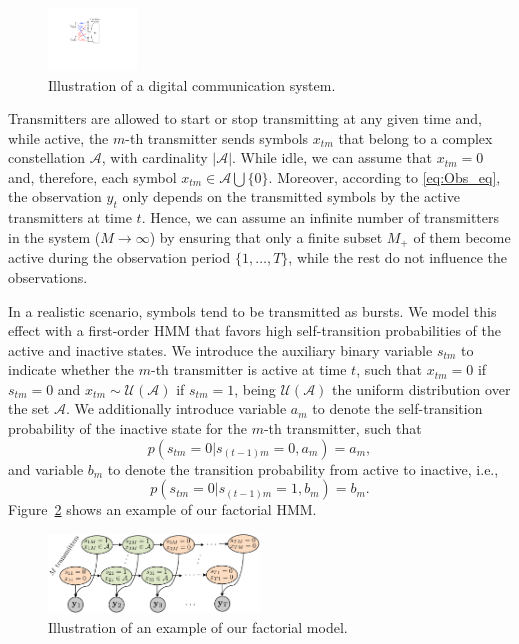 \documentclass[a4paper]{article}
\def\xtm{x_{tm}}
\def\stm{s_{tm}}
\def\Acal{\mathcal{A}}
\def\Ucal{\mathcal{U}}
\begin{document}
\begin{figure}[h]
\centering
\includegraphics[width=0.21\textwidth]{figures/MIMOchannel.pdf}
\caption{Illustration of a digital communication system.}\label{fig:MIMOchannel}
\end{figure}

Transmitters are allowed to start or stop transmitting at any given time and, while active, the $m$-th transmitter sends symbols $\xtm$ that belong to a complex constellation $\Acal$, with cardinality $|\Acal|$. While idle, we can assume that $\xtm=0$ and, therefore, each symbol $\xtm\in\Acal \bigcup \{0\}$. Moreover, according to \eqref{eq:Obs_eq}, the observation $y_t$ only depends on the transmitted symbols by the active transmitters at time $t$.  Hence, we can assume an infinite number of transmitters in the system ($M\rightarrow\infty$) by ensuring that only a finite subset $M_+$ of them become active during the observation period $\{1,\ldots,T\}$, while the rest do not influence the observations.

In a realistic scenario, symbols tend to be transmitted as bursts. We model this effect with a first-order HMM that favors high self-transition probabilities of the active and inactive states. We introduce the auxiliary binary variable $\stm$ to indicate whether the $m$-th transmitter is active at time $t$, such that $\xtm=0$ if $\stm=0$ and $\xtm\sim\Ucal(\Acal)$ if $\stm=1$, being $\Ucal(\Acal)$ the uniform distribution over the set $\Acal$. We additionally introduce variable $a_m$ to denote the self-transition probability of the inactive state for the $m$-th transmitter, such that
\begin{equation}
p(\stm=0|s_{(t-1)m}=0,a_m) = a_m,
\end{equation}
and variable $b_m$ to denote the transition probability from active to inactive, i.e.,
\begin{equation}
p(\stm=0|s_{(t-1)m}=1,b_m) = b_m.
\end{equation}
Figure~\ref{fig:modelSketch} shows an example of our factorial HMM.

\begin{figure}[b]
\centering
\includegraphics[width=0.5\textwidth]{figures/modelSketch.pdf}
\caption{Illustration of an example of our factorial model.}\label{fig:modelSketch}
\end{figure}
\end{document}
